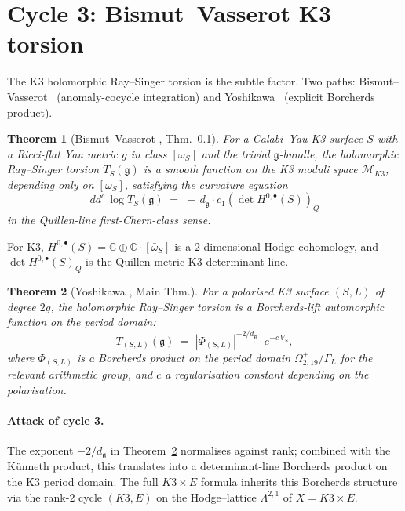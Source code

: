 \documentclass[11pt]{article}
\newtheorem{theorem}{Theorem}[section]
\theoremstyle{definition}
\providecommand{\C}{\mathbb{C}}
\providecommand{\frakg}{\mathfrak{g}}
\providecommand{\det}{\operatorname{det}}
\begin{document}
\section{Cycle 3: Bismut--Vasserot K3 torsion}
\label{sec:cycle-3}

The K3 holomorphic Ray--Singer torsion is the subtle factor. Two paths:
Bismut--Vasserot~\cite{BismutVasserot1989} (anomaly-cocycle integration) and
Yoshikawa~\cite{Yoshikawa2004} (explicit Borcherds product).

\begin{theorem}[Bismut--Vasserot \cite{BismutVasserot1989}, Thm.~0.1]
\label{thm:bismut-vasserot-k3}
For a Calabi--Yau K3 surface $S$ with a Ricci-flat Yau metric $g$ in
class $[\omega_S]$ and the trivial $\frakg$-bundle, the holomorphic
Ray--Singer torsion $T_S(\frakg)$ is a smooth function on the
K3 moduli space $\mathcal{M}_{K3}$, depending only on $[\omega_S]$,
satisfying the curvature equation
\[
dd^c\,\log T_S(\frakg) \;=\; -\,d_\frakg\cdot c_1(\det H^{0,\bullet}(S))_{Q}
\]
in the Quillen-line first-Chern-class sense.
\end{theorem}

For K3, $H^{0,\bullet}(S) = \C\oplus\C\cdot[\bar\omega_S]$ is a
$2$-dimensional Hodge cohomology, and $\det H^{0,\bullet}(S)_{Q}$ is the
Quillen-metric K3 determinant line.

\begin{theorem}[Yoshikawa \cite{Yoshikawa2004}, Main Thm.]
\label{thm:yoshikawa-k3}
For a polarised K3 surface $(S,L)$ of degree $2g$, the holomorphic Ray--Singer
torsion is a Borcherds-lift automorphic function on the period domain:
\[
T_{(S,L)}(\frakg) \;=\; |\Phi_{(S,L)}|^{-2/d_\frakg}\cdot e^{-c\,V_S},
\]
where $\Phi_{(S,L)}$ is a Borcherds product on the
period domain $\Omega^+_{2,19}/\Gamma_L$ for the relevant arithmetic
group, and $c$ a regularisation constant depending on the polarisation.
\end{theorem}

\paragraph{Attack of cycle 3.} The exponent $-2/d_\frakg$ in
Theorem~\ref{thm:yoshikawa-k3} normalises against rank; combined with
the K\"unneth product, this translates into a determinant-line Borcherds
product on the K3 period domain. The full $K3\times E$ formula
inherits this Borcherds structure via the rank-$2$ cycle $(K3,E)$ on the
Hodge--lattice $\Lambda^{2,1}$ of $X = K3\times E$.
\end{document}
